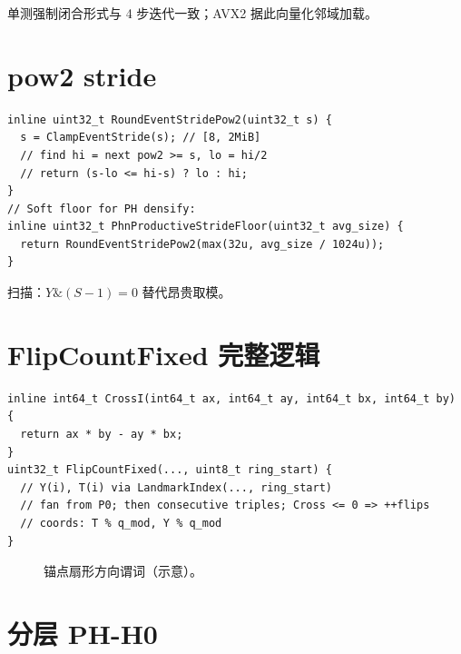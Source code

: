 单测强制闭合形式与 4 步迭代一致；AVX2 据此向量化邻域加载。

\section{pow2 stride}

\begin{lstlisting}[caption={最近二的幂（平局偏小）},label={lst:pow2-stride}]
inline uint32_t RoundEventStridePow2(uint32_t s) {
  s = ClampEventStride(s); // [8, 2MiB]
  // find hi = next pow2 >= s, lo = hi/2
  // return (s-lo <= hi-s) ? lo : hi;
}
// Soft floor for PH densify:
inline uint32_t PhnProductiveStrideFloor(uint32_t avg_size) {
  return RoundEventStridePow2(max(32u, avg_size / 1024u));
}
\end{lstlisting}

扫描：$Y\mathbin{\&}(S-1)=0$ 替代昂贵取模。

\section{FlipCountFixed 完整逻辑}

\begin{lstlisting}[caption={Native Flip（环序 + CrossI）},label={lst:phn-flip}]
inline int64_t CrossI(int64_t ax, int64_t ay, int64_t bx, int64_t by) {
  return ax * by - ay * bx;
}
uint32_t FlipCountFixed(..., uint8_t ring_start) {
  // Y(i), T(i) via LandmarkIndex(..., ring_start)
  // fan from P0; then consecutive triples; Cross <= 0 => ++flips
  // coords: T % q_mod, Y % q_mod
}
\end{lstlisting}

\begin{figure}[htbp]
\centering
{}
\caption{锚点扇形方向谓词（示意）。}
\label{fig:cross-orient}
\end{figure}

\section{分层 PH-H0}

